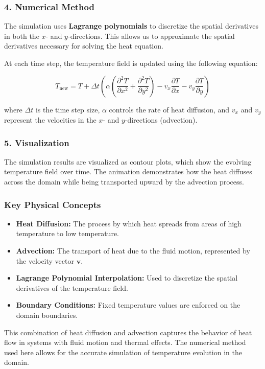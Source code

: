 \subsubsection*{4. Numerical Method}
The simulation uses \textbf{Lagrange polynomials} to discretize the spatial derivatives in both the \( x \)- and \( y \)-directions. This allows us to approximate the spatial derivatives necessary for solving the heat equation. 

At each time step, the temperature field is updated using the following equation:

\[
T_{\text{new}} = T + \Delta t \left( \alpha \left( \frac{\partial^2 T}{\partial x^2} + \frac{\partial^2 T}{\partial y^2} \right) - v_x \frac{\partial T}{\partial x} - v_y \frac{\partial T}{\partial y} \right)
\]

where \( \Delta t \) is the time step size, \( \alpha \) controls the rate of heat diffusion, and \( v_x \) and \( v_y \) represent the velocities in the \( x \)- and \( y \)-directions (advection).
\newpage
\subsubsection*{5. Visualization}
The simulation results are visualized as contour plots, which show the evolving temperature field over time. The animation demonstrates how the heat diffuses across the domain while being transported upward by the advection process.

\subsubsection*{Key Physical Concepts}
\begin{itemize}
    \item \textbf{Heat Diffusion:} The process by which heat spreads from areas of high temperature to low temperature.
    \item \textbf{Advection:} The transport of heat due to the fluid motion, represented by the velocity vector \( \mathbf{v} \).
    \item \textbf{Lagrange Polynomial Interpolation:} Used to discretize the spatial derivatives of the temperature field.
    \item \textbf{Boundary Conditions:} Fixed temperature values are enforced on the domain boundaries.
\end{itemize}

This combination of heat diffusion and advection captures the behavior of heat flow in systems with fluid motion and thermal effects. The numerical method used here allows for the accurate simulation of temperature evolution in the domain.

